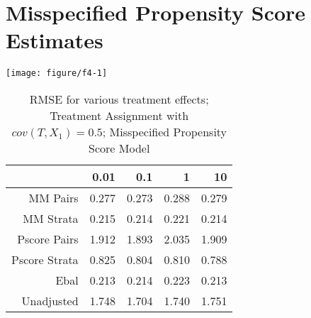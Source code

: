 \documentclass[11pt]{article}\usepackage[]{graphicx}\usepackage[]{color}
\makeatletter
\def\maxwidth{ %
  \ifdim\Gin@nat@width>\linewidth
    \linewidth
  \else
    \Gin@nat@width
  \fi
}
\newenvironment{knitrout}{}{} %
\makeatother
\begin{document}
\section{Misspecified Propensity Score Estimates}
\begin{knitrout}
\color{fgcolor}

{\centering \texttt{[image: figure/f4-1]} 

}



\end{knitrout}
\begin{table}[ht]
\centering
\begin{tabular}{rrrrr}
  \hline
 & 0.01 & 0.1 & 1 & 10 \\ 
  \hline
MM Pairs & 0.277 & 0.273 & 0.288 & 0.279 \\ 
  MM Strata & 0.215 & 0.214 & 0.221 & 0.214 \\ 
  Pscore Pairs & 1.912 & 1.893 & 2.035 & 1.909 \\ 
  Pscore Strata & 0.825 & 0.804 & 0.810 & 0.788 \\ 
  Ebal & 0.213 & 0.214 & 0.223 & 0.213 \\ 
  Unadjusted & 1.748 & 1.704 & 1.740 & 1.751 \\ 
   \hline
\end{tabular}
\caption{RMSE for various treatment effects; Treatment Assignment with $cov(T, X_1) = 0.5$; Misspecified Propensity Score Model} 
\label{tab:f4}
\end{table}
\end{document}
